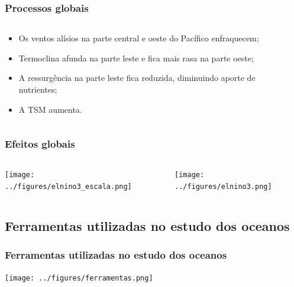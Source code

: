 \begin{frame}
    \frametitle{Processos globais}
    \begin{columns}
        \begin{column}{0.5\textwidth}
            \begin{itemize}[<+-| alert@+>]
                \item Os ventos alísios na parte central e oeste do Pacífico
                      enfraquecem;
                \item Termoclina afunda na parte leste e fica mais rasa na
                      parte oeste;
                \item A ressurgência na parte leste fica reduzida, diminuindo
                      aporte de nutrientes;
                \item A TSM aumenta.
    \end{itemize}
        \end{column}
        \begin{column}{0.3\textwidth}
            \centerline{}
            \centerline{}
        \end{column}
    \end{columns}
\end{frame}

\begin{frame}
    \frametitle{Efeitos globais}
    \begin{columns}
        \begin{column}{0.3\textwidth}
            \centerline{\texttt{[image: ../figures/elnino3\_escala.png]}}
        \end{column}
        \begin{column}{0.7\textwidth}
            \centerline{\texttt{[image: ../figures/elnino3.png]}}
        \end{column}
    \end{columns}
\end{frame}

\subsection{Ferramentas utilizadas no estudo dos oceanos}
\begin{frame}
    \frametitle{Ferramentas utilizadas no estudo dos oceanos}
    \centerline{\texttt{[image: ../figures/ferramentas.png]}}
\end{frame}

